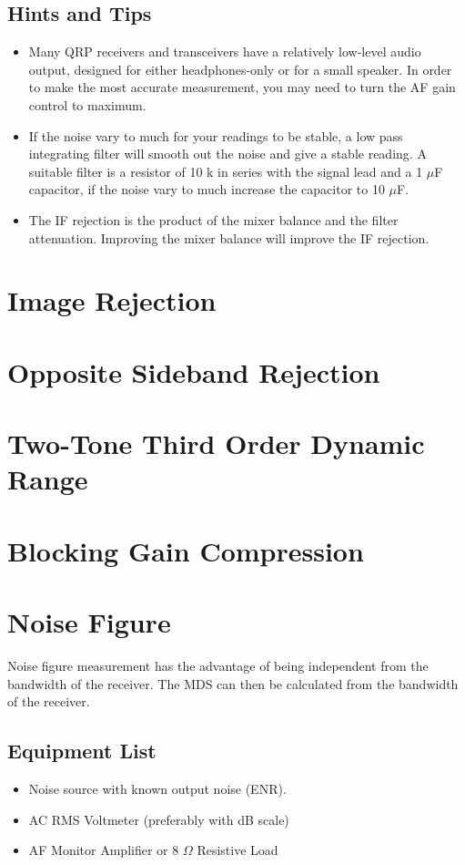 \documentclass[10pt,letterpaper]{book}
\begin{document}
\subsection*{Hints and Tips}
\begin{itemize}
	\item Many QRP receivers and transceivers have a relatively low-level audio output, designed for either headphones-only or for a small speaker. In order to make the most accurate measurement, you may need to turn the AF gain control to maximum.
	\item If the noise vary to much for your readings to be stable, a low pass integrating filter will smooth out the noise and give a stable reading. A suitable filter is a resistor of 10 k in series with the signal lead and a 1 $\mu$F capacitor, if the noise vary to much increase the capacitor to 10 $\mu$F.  
	\item The IF rejection is the product of the mixer balance and the filter attenuation. Improving the mixer balance will improve the IF rejection.
\end{itemize}

\section{Image Rejection}
\section{Opposite Sideband Rejection}
\section{Two-Tone Third Order Dynamic Range}
\section{Blocking Gain Compression}
\section{Noise Figure}
Noise figure measurement has the advantage of being independent from the bandwidth of the receiver. The MDS can then be calculated from the bandwidth of the receiver.
\subsection*{Equipment List}
\begin{itemize}
	\item Noise source with known output noise (ENR).
	\item AC RMS Voltmeter (preferably with dB scale)
	\item AF Monitor Amplifier or 8 $\Omega$ Resistive Load
\end{itemize}
\end{document}
